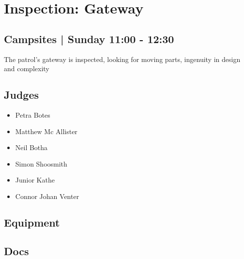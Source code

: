 \documentclass[10pt]{article}
\begin{document}
		\begin{minipage}{\linewidth}
		\setcounter{section}{45}
	\section{Inspection: Gateway }
	\subsection*{Campsites | Sunday 11:00 - 12:30}

	The patrol's gateway is inspected, looking for moving parts, ingenuity in design and complexity

	\begin{multicols}{2}
	\subsection*{\faUsers \: Judges}
	\begin{itemize}
			\item Petra Botes
			\item Matthew Mc Allister
			\item Neil Botha
			\item Simon Shoosmith
			\item Junior Kathe
			\item Connor Johan Venter
		\end{itemize}
	\columnbreak
	\subsection*{\faWrench \: Equipment}
	        \vfill\null
        \subsection*{\faFile \: Docs}
     	\end{multicols}


	\vspace{1cm}
	\end{minipage}
\end{document}

